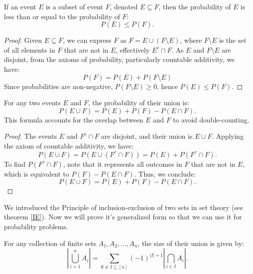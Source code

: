     \begin{proposition}
    If an event \( E \) is a subset of event \( F \), denoted \( E \subseteq F \), then the probability of \( E \) is less than or equal to the probability of \( F \):
    \[ P(E) \leq P(F). \]
    \end{proposition}
    
    \begin{proof}
    Given \( E \subseteq F \), we can express \( F \) as \( F = E \cup (F \setminus E) \), where \( F \setminus E \) is the set of all elements in \( F \) that are not in \( E \), effectively \( E^c \cap F \). As \( E \) and \( F \setminus E \) are disjoint, from the axioms of probability, particularly countable additivity, we have:
    \[ P(F) = P(E) + P(F \setminus E) \]
    Since probabilities are non-negative, \( P(F \setminus E) \geq 0 \), hence \( P(E) \leq P(F) \).
    \end{proof}
    
    \begin{proposition}
    For any two events \( E \) and \( F \), the probability of their union is:
    \[ P(E \cup F) = P(E) + P(F) - P(E \cap F). \]
    This formula accounts for the overlap between \( E \) and \( F \) to avoid double-counting.
    \end{proposition}
    
    \begin{proof}
    The events \( E \) and \( F^c \cap F \) are disjoint, and their union is \( E \cup F \). Applying the axiom of countable additivity, we have:
    \[ P(E \cup F) = P(E \cup (F^c \cap F)) = P(E) + P(F^c \cap F). \]
    To find \( P(F^c \cap F) \), note that it represents all outcomes in \( F \) that are not in \( E \), which is equivalent to \( P(F) - P(E \cap F) \). Thus, we conclude:
    \[ P(E \cup F) = P(E) + P(F) - P(E \cap F). \]
    \end{proof}
    
    We introduced the Principle of inclusion-exclusion of two sets in set theory (see theorem \ref{IE}).
    Now we will prove it's generalized form so that we can use it for probability 
    problems.

    \begin{theorem}
        For any collection of finite sets \( A_1, A_2, \ldots, A_n \), the size of their union is given by:
        \begin{equation}
        \left|\bigcup_{i=1}^{n} A_i\right| = \sum_{\emptyset \neq I \subseteq [n]} (-1)^{|I|+1} \left|\bigcap_{i \in I} A_i\right|.
        \end{equation}
    \end{theorem}
        
